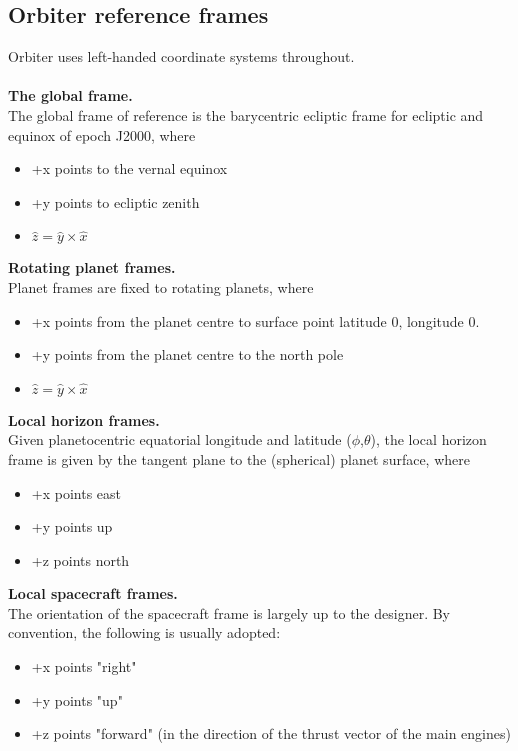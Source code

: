 \documentclass[Orbiter Technical Reference.tex]{subfiles}
\begin{document}
\subsection{Orbiter reference frames}
Orbiter uses left-handed coordinate systems throughout.\\
\\
\textbf{The global frame.}\\
The global frame of reference is the barycentric ecliptic frame for ecliptic and equinox of epoch J2000, where

\begin{itemize}
\item +x points to the vernal equinox
\item +y points to ecliptic zenith
\item $\hat{z} = \hat{y} \times \hat{x}$
\end{itemize}

\noindent
\textbf{Rotating planet frames.}\\
Planet frames are fixed to rotating planets, where

\begin{itemize}
\item +x points from the planet centre to surface point latitude 0, longitude 0.
\item +y points from the planet centre to the north pole
\item $\hat{z} = \hat{y} \times \hat{x}$
\end{itemize}

\noindent
\textbf{Local horizon frames.}\\
Given planetocentric equatorial longitude and latitude ($\phi$,$\theta$), the local horizon frame is given by the tangent plane to the (spherical) planet surface, where

\begin{itemize}
\item +x points east
\item +y points up
\item +z points north
\end{itemize}

\noindent
\textbf{Local spacecraft frames.}\\
The orientation of the spacecraft frame is largely up to the designer. By convention, the following is usually adopted:

\begin{itemize}
\item +x points "right"
\item +y points "up"
\item +z points "forward" (in the direction of the thrust vector of the main engines)
\end{itemize}
\end{document}
